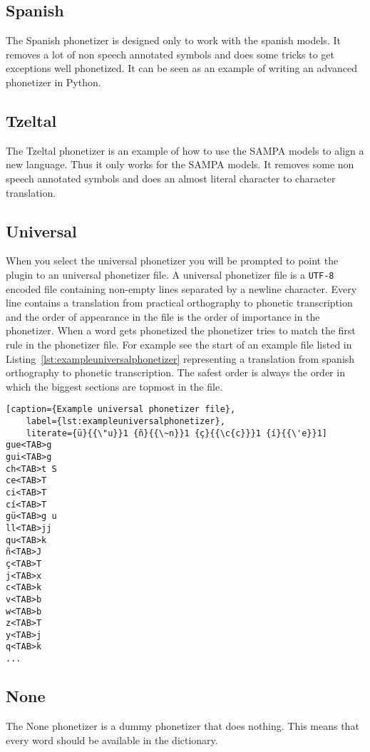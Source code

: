 \subsection{Spanish}
The Spanish phonetizer is designed only to work with the spanish models. It
removes a lot of non speech annotated symbols and does some tricks to get
exceptions well phonetized. It can be seen as an example of writing an advanced
phonetizer in Python.

\subsection{Tzeltal}
The Tzeltal phonetizer is an example of how to use the SAMPA models to align a
new language. Thus it only works for the SAMPA models. It removes some non
speech annotated symbols and does an almost literal character to character
translation.

\subsection{Universal}\label{sec:univphonetizer}
When you select the universal phonetizer you will be prompted to point the
plugin to an universal phonetizer file.
A universal phonetizer file is a \texttt{UTF-8} encoded file containing
non-empty lines separated by a newline character. Every line contains a
translation from practical orthography to phonetic transcription and the order
of appearance in the file is the order of importance in the phonetizer. When a
word gets phonetized the phonetizer tries to match the first rule in the
phonetizer file. For example see the start of an example file listed in
Listing~\ref{lst:exampleuniversalphonetizer} representing a translation from
spanish orthography to phonetic transcription. The safest order is always the
order in which the biggest sections are topmost in the file.

\begin{lstlisting}[caption={Example universal phonetizer file},
	label={lst:exampleuniversalphonetizer},
	literate={ü}{{\"u}}1 {ñ}{{\~n}}1 {ç}{{\c{c}}}1 {í}{{\'e}}1]
gue<TAB>g
gui<TAB>g
ch<TAB>t S
ce<TAB>T
ci<TAB>T
cí<TAB>T
gü<TAB>g u
ll<TAB>jj
qu<TAB>k
ñ<TAB>J
ç<TAB>T
j<TAB>x
c<TAB>k
v<TAB>b
w<TAB>b
z<TAB>T
y<TAB>j
q<TAB>k
...
\end{lstlisting}

\subsection{None}
The None phonetizer is a dummy phonetizer that does nothing. This means that
every word should be available in the dictionary.

